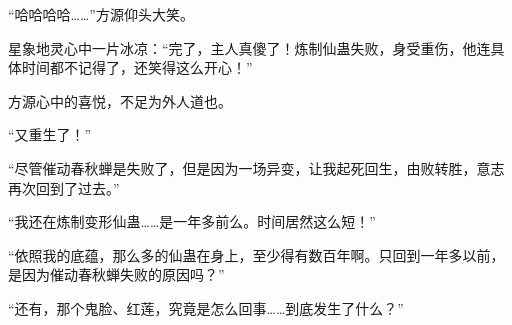 \begin{this_body}
“哈哈哈哈……”方源仰头大笑。

星象地灵心中一片冰凉：“完了，主人真傻了！炼制仙蛊失败，身受重伤，他连具体时间都不记得了，还笑得这么开心！”

方源心中的喜悦，不足为外人道也。

“又重生了！”

“尽管催动春秋蝉是失败了，但是因为一场异变，让我起死回生，由败转胜，意志再次回到了过去。”

“我还在炼制变形仙蛊……是一年多前么。时间居然这么短！”

“依照我的底蕴，那么多的仙蛊在身上，至少得有数百年啊。只回到一年多以前，是因为催动春秋蝉失败的原因吗？”

“还有，那个鬼脸、红莲，究竟是怎么回事……到底发生了什么？”

\end{this_body}

